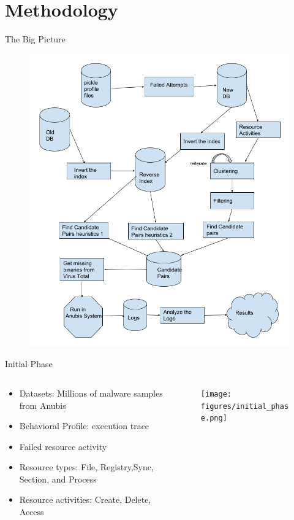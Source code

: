\documentclass{beamer}
\begin{document}
\section{Methodology}
\label{sec:Methodology}
\begin{frame}[h]{The Big Picture}
  \begin{figure}[h]
    \centering
    \includegraphics[scale=0.25]{figures/bigpicture.png}
  \label{fig:malware_type}
  \end{figure}
\end{frame}
\begin{frame}[h]{Initial Phase}
  \begin{columns}
    \begin{column}{5cm}
      \begin{itemize}
        \item Datasets: Millions of malware samples from Anubis
        \item Behavioral Profile: execution trace
        \item Failed resource activity
        \item Resource types: File, Registry,Sync, Section, and Process
        \item Resource activities: Create, Delete, Access
      \end{itemize}
    \end{column}
    \begin{column}{5cm}
      \begin{figure}[h]
        \centering
        \texttt{[image: figures/initial\_phase.png]}
      \label{fig:malware_type}
      \end{figure}
    \end{column}
  \end{columns}
\end{frame}
\end{document}
